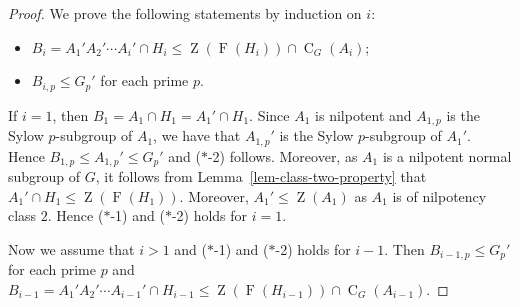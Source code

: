\documentclass[12pt,a4paper]{article}
\DeclareMathOperator{\C}{C}
\DeclareMathOperator{\Z}{Z}
\DeclareMathOperator{\Fit}{F}
\theoremstyle{definition}
\begin{document}
\begin{proof}
We prove the following statements by induction on $i$:
\begin{itemize}
\item[($\ast$-1)] $B_i=A_1'A_2' \cdots A_i' \cap H_i \leq \Z(\Fit(H_i)) \cap \C_G(A_{i})$;
\item[($\ast$-2)] $B_{i,p} \leq G_p'$ for each prime $p$.
\end{itemize}
If $i=1$, then
$B_1=A_1 \cap H_1 =A_1' \cap H_1$. Since $A_1$ is nilpotent and $A_{1,p}$ is the Sylow $p$-subgroup of $A_1$, we have that $A_{1,p}'$ is the Sylow $p$-subgroup of $A_1'$. Hence $B_{1,p} \leq A_{1,p}' \leq G_p'$ and ($\ast$-2) follows. Moreover, as $A_1$ is a nilpotent normal subgroup of $G$, it follows from Lemma~\ref{lem-class-two-property} that
$A_1' \cap H_1 \leq \Z(\Fit(H_1))$. Moreover, $A_1' \leq \Z(A_1)$ as $A_1$ is of nilpotency class $2$. Hence ($\ast$-1) and ($\ast$-2) holds for $i=1$.

Now we assume that $i > 1$ and ($\ast$-1) and ($\ast$-2) holds for $i-1$.
Then  $B_{i-1, p} \leq G_p'$ for each prime $p$ and
$B_{i-1}=A_1'A_2' \cdots A_{i-1}' \cap H_{i-1} \leq \Z(\Fit(H_{i-1})) \cap \C_G(A_{i-1}).$








\end{proof}
\end{document}
